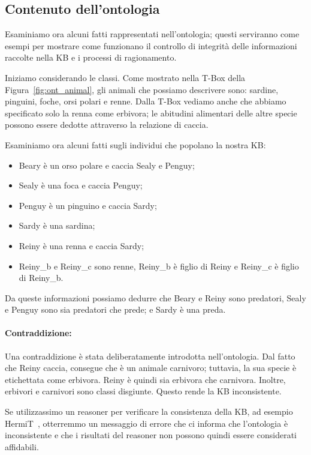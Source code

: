 \subsection{Contenuto dell'ontologia}
Esaminiamo ora alcuni fatti rappresentati nell'ontologia; questi serviranno come esempi per mostrare come funzionano il controllo di integrità delle informazioni raccolte nella KB e i processi di ragionamento.

Iniziamo considerando le classi. Come mostrato nella T-Box della Figura~\ref{fig:ont_animal}, gli animali che possiamo descrivere sono: sardine, pinguini, foche, orsi polari e renne. Dalla T-Box vediamo anche che abbiamo specificato solo la renna come erbivora; le abitudini alimentari delle altre specie possono essere dedotte attraverso la relazione di caccia.

Esaminiamo ora alcuni fatti sugli individui che popolano la nostra KB:
\begin{itemize}
	\item Beary è un orso polare e caccia Sealy e Penguy;
	\item Sealy è una foca e caccia Penguy;
	\item Penguy è un pinguino e caccia Sardy;
	\item Sardy è una sardina;
	\item Reiny è una renna e caccia Sardy;
	\item Reiny\_b e Reiny\_c sono renne, Reiny\_b è figlio di Reiny e Reiny\_c è figlio di Reiny\_b.
\end{itemize}

Da queste informazioni possiamo dedurre che Beary e Reiny sono predatori, Sealy e Penguy sono sia predatori che prede; e Sardy è una preda.

\paragraph{Contraddizione: } Una contraddizione è stata deliberatamente introdotta nell'ontologia. Dal fatto che Reiny caccia, consegue che è un animale carnivoro; tuttavia, la sua specie è etichettata come erbivora. Reiny è quindi sia erbivora che carnivora. Inoltre, erbivori e carnivori sono classi disgiunte. Questo rende la KB inconsistente.

Se utilizzassimo un reasoner per verificare la consistenza della KB, ad esempio HermiT~\cite{glimm2014hermit}, otterremmo un messaggio di errore che ci informa che l'ontologia è inconsistente e che i risultati del reasoner non possono quindi essere considerati affidabili.

